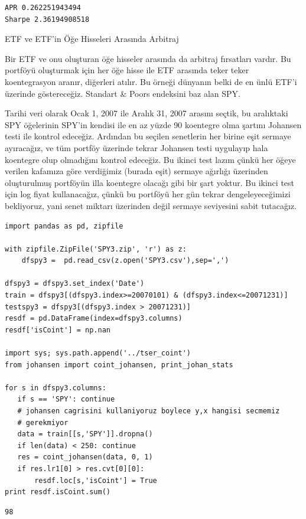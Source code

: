 \documentclass[12pt,fleqn]{article}\usepackage{../../common}
\begin{document}
\begin{verbatim}
APR 0.262251943494
Sharpe 2.36194908518
\end{verbatim}

ETF ve ETF'in Öğe Hisseleri Arasında Arbitraj

Bir ETF ve onu oluşturan öğe hisseler arasında da arbitraj fırsatları
vardır. Bu portföyü oluşturmak için her öğe hisse ile ETF arasında teker
teker koentegrasyon aranır, diğerleri atılır. Bu örneği dünyanın belki de
en ünlü ETF'i üzerinde göstereceğiz. Standart \& Poors endeksini baz alan
SPY.

Tarihi veri olarak Ocak 1, 2007 ile Aralık 31, 2007 arasını seçtik, bu
aralıktaki SPY öğelerinin SPY'in kendisi ile en az yüzde 90 koentegre olma
şartını Johansen testi ile kontrol edeceğiz. Ardından bu seçilen senetlerin
her birine eşit sermaye ayıracağız, ve tüm portföy üzerinde tekrar Johansen
testi uygulayıp hala koentegre olup olmadığını kontrol edeceğiz. Bu ikinci
test lazım çünkü her öğeye verilen kafamıza göre verdiğimiz (burada eşit)
sermaye ağırlığı üzerinden oluşturulmuş portföyün illa koentegre olacağı
gibi bir şart yoktur. Bu ikinci test için log fiyat kullanacağız, çünkü bu
portföyü her gün tekrar dengeleyeceğimizi bekliyoruz, yani senet miktarı
üzerinden değil sermaye seviyesini sabit tutacağız. 

\begin{verbatim}
import pandas as pd, zipfile

with zipfile.ZipFile('SPY3.zip', 'r') as z:
    dfspy3 =  pd.read_csv(z.open('SPY3.csv'),sep=',')

dfspy3 = dfspy3.set_index('Date')
train = dfspy3[(dfspy3.index>=20070101) & (dfspy3.index<=20071231)]
testspy3 = dfspy3[(dfspy3.index > 20071231)]
resdf = pd.DataFrame(index=dfspy3.columns)
resdf['isCoint'] = np.nan

import sys; sys.path.append('../tser_coint')
from johansen import coint_johansen, print_johan_stats

for s in dfspy3.columns: 
   if s == 'SPY': continue
   # johansen cagrisini kullaniyoruz boylece y,x hangisi secmemiz 
   # gerekmiyor
   data = train[[s,'SPY']].dropna()
   if len(data) < 250: continue
   res = coint_johansen(data, 0, 1)
   if res.lr1[0] > res.cvt[0][0]: 
       resdf.loc[s,'isCoint'] = True
print resdf.isCoint.sum()
\end{verbatim}

\begin{verbatim}
98
\end{verbatim}
\end{document}
